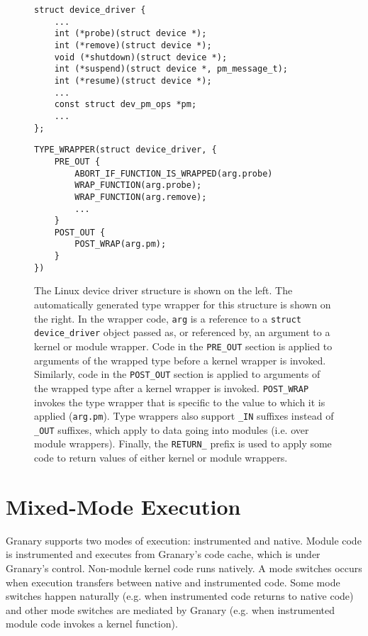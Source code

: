 \documentclass[preprint]{sigplanconf}
\begin{document}
\begin{figure*}[t!]
\lstset{language=C, tabsize=2, stepnumber=1}
\begin{multicols}{2}
\begin{lstlisting}[basicstyle=\footnotesize\ttfamily]
struct device_driver {
	...
	int (*probe)(struct device *);
	int (*remove)(struct device *);
	void (*shutdown)(struct device *);
	int (*suspend)(struct device *, pm_message_t);
	int (*resume)(struct device *);
	...
	const struct dev_pm_ops *pm;
	...
};
\end{lstlisting}
\columnbreak
\begin{lstlisting}[basicstyle=\footnotesize\ttfamily]
TYPE_WRAPPER(struct device_driver, {
    PRE_OUT {
        ABORT_IF_FUNCTION_IS_WRAPPED(arg.probe)
        WRAP_FUNCTION(arg.probe);
        WRAP_FUNCTION(arg.remove);
        ...
    }
    POST_OUT {
        POST_WRAP(arg.pm);
    }
})
\end{lstlisting}
\end{multicols}
\vspace{-1em}
\caption{The Linux device driver structure is shown on the left. The automatically generated type wrapper for this structure is shown on the right. In the wrapper code, \texttt{arg} is a reference to a \texttt{struct device\_driver} object passed as, or referenced by, an argument to a kernel or module wrapper. Code in the \texttt{PRE\_OUT} section is applied to arguments of the wrapped type before a kernel wrapper is invoked. Similarly, code in the \texttt{POST\_OUT} section is applied to arguments of the wrapped type after a kernel wrapper is invoked. \texttt{POST\_WRAP} invokes the type wrapper that is specific to the value to which it is applied (\texttt{arg.pm}). Type wrappers also support \texttt{\_IN} suffixes instead of \texttt{\_OUT} suffixes, which apply to data going into modules (i.e. over module wrappers). Finally, the \texttt{RETURN\_} prefix is used to apply some code to return values of either kernel or module wrappers.}
\label{fig:type_wrapper}
\end{figure*}

\section{Mixed-Mode Execution}\label{sec:modes}
Granary supports two modes of execution: instrumented and native. Module code is instrumented and executes from Granary's code cache, which is under Granary's control. Non-module kernel code runs natively. A mode switches occurs when execution transfers between native and instrumented code. Some mode switches happen naturally (e.g. when instrumented code returns to native code) and other mode switches are mediated by Granary (e.g. when instrumented module code invokes a kernel function).
\end{document}
